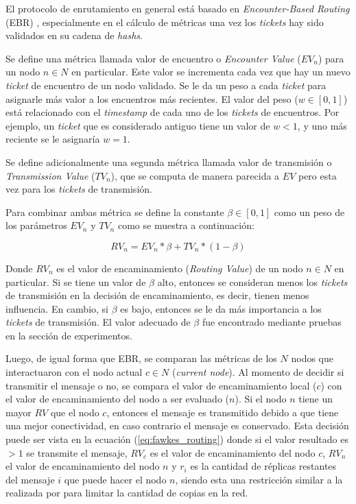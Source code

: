 El protocolo de enrutamiento en general está basado en \textit{Encounter-Based
Routing} (EBR) \cite{ebr}, especialmente en el cálculo de métricas una vez los
\textit{tickets} hay sido validados en su cadena de \textit{hashs}.


Se define una métrica llamada valor de encuentro o \textit{Encounter Value}
($EV_n$) para un nodo $n \in N$ en particular. Este valor se incrementa cada vez
que hay un nuevo \textit{ticket} de encuentro de un nodo validado. Se le da un
peso a cada \textit{ticket} para asignarle más valor a los encuentros más
recientes. El valor del peso ($w \in [0, 1]$) está relacionado con el
\textit{timestamp} de cada uno de los \textit{tickets} de encuentros. Por
ejemplo, un \textit{ticket} que es considerado antiguo tiene un valor de $w <
1$, y uno más reciente se le asignaría $w = 1$.


Se define adicionalmente una segunda métrica llamada valor de transmisión
o \textit{Transmission Value} ($TV_n$), que se computa de manera parecida a $EV$
pero esta vez para los \textit{tickets} de transmisión.


Para combinar ambas métrica se define la constante $\beta \in [0, 1]$ como un
peso de los parámetros $EV_n$ y $TV_n$ como se muestra a continuación:

\begin{equation}
  RV_n = EV_n * \beta + TV_n * (1 - \beta)
  \label{eq:valores_encuentro}
\end{equation}

Donde $RV_n$ es el valor de encaminamiento (\textit{Routing Value}) de un nodo
$n \in N$ en particular. Si se tiene un valor de $\beta$ alto, entonces se
consideran menos los \textit{tickets} de transmisión en la decisión de
encaminamiento, es decir, tienen menos influencia. En cambio, si $\beta$ es bajo, entonces
se le da más importancia a los \textit{tickets} de transmisión. El valor
adecuado de $\beta$ fue encontrado mediante pruebas en la sección de
experimentos.


Luego, de igual forma que EBR, se comparan las métricas de los $N$ nodos que
interactuaron con el nodo actual $c \in N$ (\textit{current node}). Al momento
de decidir si transmitir el mensaje o no, se compara el valor de encaminamiento
local ($c$) con el valor de encaminamiento del nodo a ser evaluado ($n$). Si el
nodo $n$ tiene un mayor $RV$ que el nodo $c$, entonces el mensaje es transmitido
debido a que tiene una mejor conectividad, en caso contrario el mensaje es
conservado. Esta decisión puede ser vista en la ecuación
(\ref{eq:fawkes_routing}) donde si el valor resultado es $> 1$ se transmite el
mensaje, $RV_c$ es el valor de encaminamiento del nodo $c$, $RV_n$ el valor de
encaminamiento del nodo $n$ y $r_i$ es la cantidad de réplicas restantes del
mensaje $i$ que puede hacer el nodo $n$, siendo esta una restricción similar a
la realizada por \syw{} para limitar la cantidad de copias en la red.



